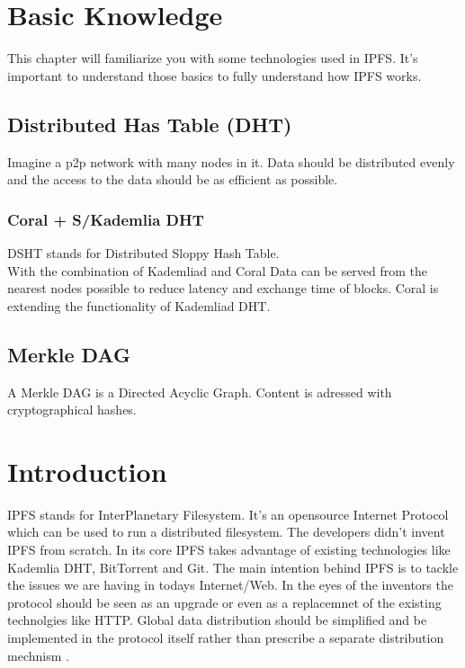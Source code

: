 \documentclass[a4paper,11pt, oneside]{report}
\theoremstyle{definition}
\begin{document}
\chapter{Basic Knowledge}
This chapter will familiarize you with some technologies used in IPFS. It's important to understand those basics to fully understand how IPFS works.

\section{Distributed Has Table (DHT)}
Imagine a p2p network with many nodes in it. Data should be distributed evenly and the access to the data should be as efficient as possible.

\subsection{Coral + S/Kademlia DHT}
DSHT stands for Distributed Sloppy Hash Table.\\
With the combination of Kademliad and Coral Data can be served from the nearest nodes possible to reduce latency and exchange time of blocks.
Coral is extending the functionality of Kademliad DHT. 



\section{Merkle DAG}
A Merkle DAG is a Directed Acyclic Graph. Content is adressed with cryptographical hashes.



\chapter{Introduction}
IPFS stands for InterPlanetary Filesystem. It's an opensource Internet Protocol which can be used to run a distributed filesystem.
The developers didn't invent IPFS from scratch. In its core IPFS takes advantage of existing technologies like Kademlia DHT, BitTorrent and Git. The main intention behind IPFS is to tackle the issues  we are having in todays Internet/Web. In the eyes of the inventors the protocol should be seen as an upgrade or even as a replacemnet of the existing technolgies like HTTP. Global data distribution should be simplified and be implemented in the protocol itself rather than prescribe a separate distribution mechnism \cite{IPFSBasics}.
\end{document}
